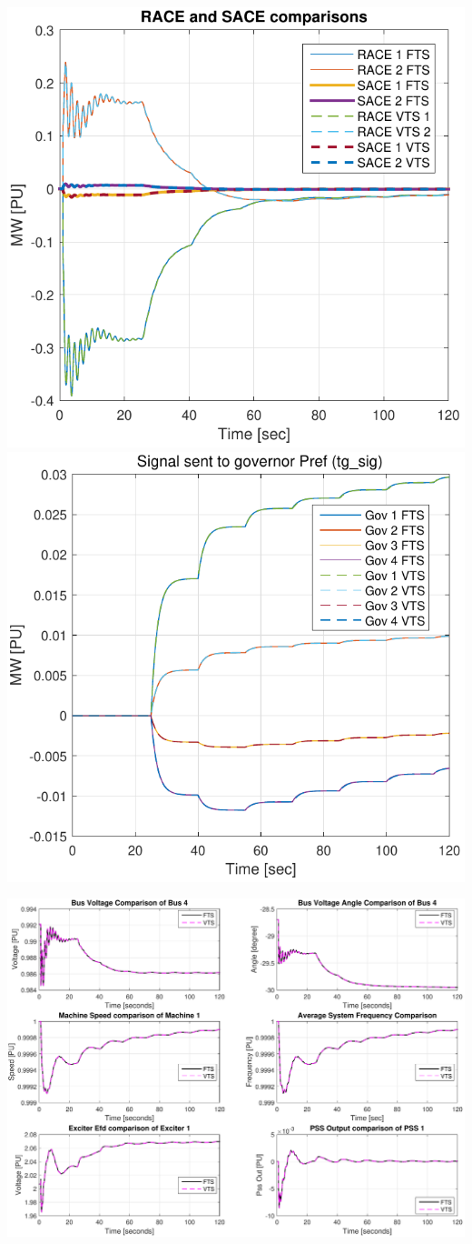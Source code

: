 \documentclass[12pt]{article}
\begin{document}
\includegraphics[width=.5\linewidth]{AGCcalcs} %
\includegraphics[width=.5\linewidth]{AGCtgSig}

\includegraphics[width=\linewidth]{AGCcomp} 
\end{document}
